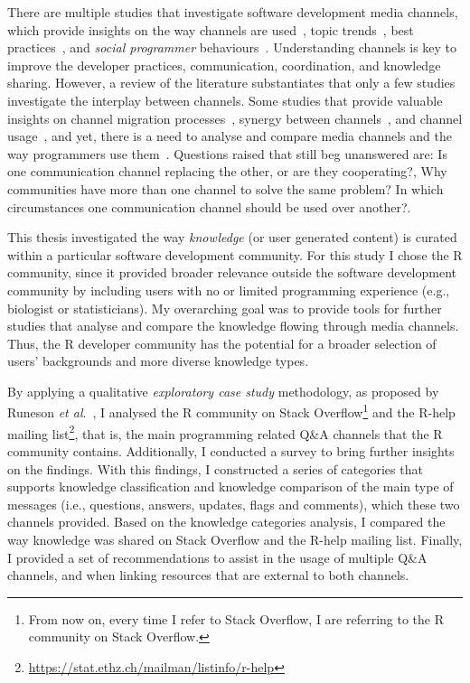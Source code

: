 \documentclass{sig-alternate-05-2015}
\begin{document}
	There are multiple studies that investigate software development media channels, which provide insights on the way channels are used~\cite{Guzzi2013, Storey2014, Singer2014},  topic trends~\cite{Barua2012, Kavaler2013, Wang2013d}, best practices~\cite{Asaduzzaman2013, Treude2011, Allamanis2013}, and \textit{social programmer} behaviours~\cite{Lang2013}.
	Understanding channels is key to improve the developer practices, communication, coordination, and knowledge sharing.
	However, a review of the literature substantiates that only a few studies investigate the interplay between channels.
	Some studies that provide valuable insights on channel migration processes~\cite{Vasilescu2014c}, synergy between channels~\cite{Vasilescu2013a, Bird2006, Kavaler2013}, and channel usage~\cite{Stolee2010,Storey2014}, and yet, there is a need to analyse and compare media channels and the way programmers use them~\cite{Vasilescu2014b}.
	Questions raised that still beg unanswered are: Is one communication channel replacing the other, or are they cooperating?, Why communities have more than one channel to solve the same problem? In which circumstances one communication channel should be used over another?.


	This thesis investigated the way \textit{knowledge} (or user generated content) is curated within a particular software development community.
	For this study I chose the R community, since it provided broader relevance outside the software development community by including users with no or limited programming experience (e.g., biologist or statisticians).
	My overarching goal was to provide tools for further studies that analyse and compare the knowledge flowing through media channels.
	Thus, the R developer community has the potential for a broader selection of users' backgrounds and more diverse knowledge types. 

	By applying a qualitative \textit{exploratory case study} methodology, as proposed by Runeson \textit{et al}.~\cite{Runeson2012}, I analysed the R community on Stack Overflow\footnote{From now on, every time I refer to Stack Overflow, I are referring to the R community on Stack Overflow.} and the R-help mailing list\footnote{\url{https://stat.ethz.ch/mailman/listinfo/r-help}}, that is, the main programming related Q\&A channels that the R community contains.
	Additionally, I conducted a survey to bring further insights on the findings.
	With this findings, I constructed a series of categories that supports knowledge classification and knowledge comparison of the main type of messages (i.e., questions, answers, updates, flags and comments), which these two channels provided.
	Based on the knowledge categories analysis, I compared the way knowledge was shared on Stack Overflow and the R-help mailing list.
	Finally, I provided a set of recommendations to assist in the usage of multiple Q\&A channels, and when linking resources that are external to both channels.
\end{document}
